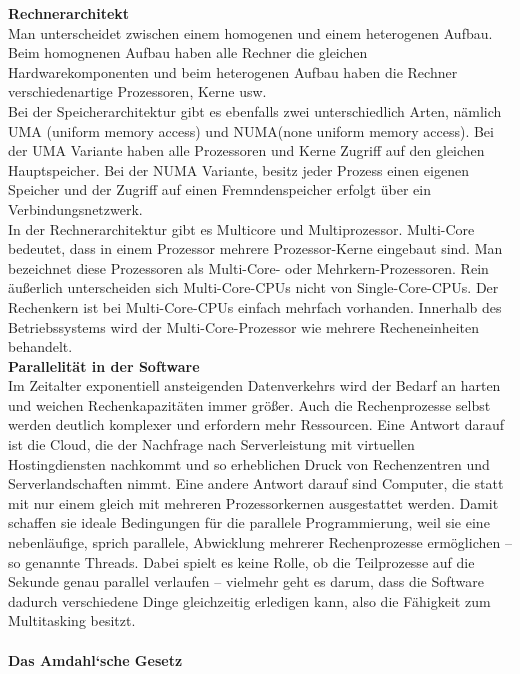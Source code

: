 \documentclass[a4paper,12pt]{article}
\begin{document}
\textbf{Rechnerarchitekt\\}
Man unterscheidet zwischen einem homogenen und einem heterogenen Aufbau. Beim homognenen Aufbau haben alle Rechner die gleichen Hardwarekomponenten und beim heterogenen Aufbau haben die Rechner verschiedenartige Prozessoren, Kerne usw.\\
Bei der Speicherarchitektur gibt es ebenfalls zwei unterschiedlich Arten, nämlich UMA (uniform memory access) und NUMA(none uniform memory access). Bei der UMA Variante haben alle Prozessoren und Kerne Zugriff auf den gleichen Hauptspeicher. Bei der NUMA Variante, besitz jeder Prozess einen eigenen Speicher und der Zugriff auf einen Fremndenspeicher erfolgt über ein Verbindungsnetzwerk.\\
In der Rechnerarchitektur gibt es Multicore und Multiprozessor. Multi-Core bedeutet, dass in einem Prozessor mehrere Prozessor-Kerne eingebaut sind. Man bezeichnet diese Prozessoren als Multi-Core- oder Mehrkern-Prozessoren. Rein äußerlich unterscheiden sich Multi-Core-CPUs nicht von Single-Core-CPUs. Der Rechenkern ist bei Multi-Core-CPUs einfach mehrfach vorhanden. Innerhalb des Betriebssystems wird der Multi-Core-Prozessor wie mehrere Recheneinheiten behandelt.\\
\newpage
\noindent
\textbf{Parallelität in der Software\\}
Im Zeitalter exponentiell ansteigenden Datenverkehrs wird der Bedarf an harten und weichen Rechenkapazitäten immer größer. Auch die Rechenprozesse selbst werden deutlich komplexer und erfordern mehr Ressourcen. Eine Antwort darauf ist die Cloud, die der Nachfrage nach Serverleistung mit virtuellen Hostingdiensten nachkommt und so erheblichen Druck von Rechenzentren und Serverlandschaften nimmt.
Eine andere Antwort darauf sind Computer, die statt mit nur einem gleich mit mehreren Prozessorkernen ausgestattet werden. Damit schaffen sie ideale Bedingungen für die parallele Programmierung, weil sie eine nebenläufige, sprich parallele, Abwicklung mehrerer Rechenprozesse ermöglichen – so genannte Threads. Dabei spielt es keine Rolle, ob die Teilprozesse auf die Sekunde genau parallel verlaufen – vielmehr geht es darum, dass die Software dadurch verschiedene Dinge gleichzeitig erledigen kann, also die Fähigkeit zum Multitasking besitzt.\\\\
\textbf{Das Amdahl‘sche Gesetz\\}
\end{document}

